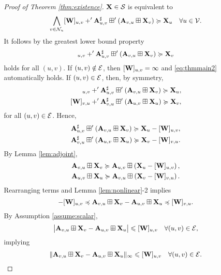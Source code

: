 \documentclass[letterpaper, 10 pt, conference]{ieeeconf}
\begin{document}
\begin{proof}[Proof of Theorem \ref{thm:existence}]
    $\mathbf{X} \in \mathcal{S}$ is equivalent to 
    \begin{align*}
        \bigwedge_{v \in \mathcal{N}_u} [\mathbf{W}]_{u,v} +' {\mathbf{A}}^{\sharp}_{u,v} \boxplus' \left( \mathbf{A}_{v,u} \boxplus \mathbf{X}_v \right) \succcurlyeq \mathbf{X}_u \quad \forall u \in \mathcal{V}.
    \end{align*}
   It follows by the greatest lower bound property
   \begin{align}
       [\W]_{u,v} +' \inv{\A}_{u,v} \meettimes \left( \A_{v,u} \jointimes \X_v \right) \succeq \X_v \label{eq:thmmain2}
   \end{align}
   holds for all $(u,v)$. If $(u,v) \notin \mathcal{E}$, then $[\mathbf{W}]_{u,v} = \infty$ and \eqref{eq:thmmain2} automatically holds. If $(u,v) \in \mathcal{E}$, then, by symmetry,
   \begin{align*}
       [\W]_{u,v} +' \inv{\A}_{u,v} \meettimes \left( \A_{v,u} \jointimes \X_v \right) \succeq \X_u, \\
       [\W]_{v,u} +' \inv{\A}_{v,u} \meettimes \left( \A_{u,v} \jointimes \X_u \right) \succeq \X_v, 
   \end{align*}
   for all $(u,v) \in \mathcal{E}$. Hence,
    \begin{align*}
       {\mathbf{A}}^{\sharp}_{u,v} \boxplus' \left( \mathbf{A}_{v,u} \boxplus \mathbf{X}_v \right) \succcurlyeq \mathbf{X}_u - [\mathbf{W}]_{u,v},  \\
       {\mathbf{A}}^{\sharp}_{v,u} \boxplus' \left( \mathbf{A}_{u,v} \boxplus \mathbf{X}_u \right) \succcurlyeq \mathbf{X}_v - [\mathbf{W}]_{v,u}.
   \end{align*}
   By Lemma \ref{lem:adjoint},
    \begin{align*}
        \mathbf{A}_{v,u} \boxplus \mathbf{X}_v  \succcurlyeq \mathbf{A}_{u,v} \boxplus \left( \mathbf{X}_u - [\mathbf{W}]_{u,v} \right), \\
        \mathbf{A}_{u,v} \boxplus \mathbf{X}_u  \succcurlyeq \mathbf{A}_{v,u} \boxplus \left( \mathbf{X}_v - [\mathbf{W}]_{v,u} \right). 
   \end{align*}
   Rearranging terms and Lemma \ref{lem:nonlinear}-2 implies
   \begin{align*}
   -[\mathbf{W}]_{u,v} \preccurlyeq \mathbf{A}_{v,u} \boxplus \mathbf{X}_v - \mathbf{A}_{u,v} \boxplus \mathbf{X}_u \preccurlyeq [\mathbf{W}]_{v,u}.
   \end{align*}
   By Assumption \ref{assume:scalar},
    \begin{align*}
   \big| \mathbf{A}_{v,u} \boxplus \mathbf{X}_v  - \mathbf{A}_{u,v} \boxplus \mathbf{X}_u \big| \leqslant [\mathbf{W}]_{u,v} \quad  \forall (u,v) \in \mathcal{E},
    \end{align*}
    implying 
    \begin{align*}
        \| \mathbf{A}_{v,u} \boxplus \mathbf{X}_v - \mathbf{A}_{u,v} \boxplus \mathbf{X}_u  \|_{\infty} \leqslant [\mathbf{W}]_{u,v} \quad \forall (u,v) \in \mathcal{E}.
    \end{align*}
\end{proof}
\end{document}
